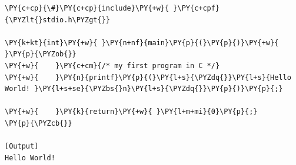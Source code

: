 \begin{Verbatim}[label=\makebox{\url{https://github.com/lucabaldini/cmepda/tree/master/slides/latex/snippets/hello_world.c}},commandchars=\\\{\}]
\PY{c+cp}{\#}\PY{c+cp}{include}\PY{+w}{ }\PY{c+cpf}{\PYZlt{}stdio.h\PYZgt{}}

\PY{k+kt}{int}\PY{+w}{ }\PY{n+nf}{main}\PY{p}{(}\PY{p}{)}\PY{+w}{ }\PY{p}{\PYZob{}}
\PY{+w}{    }\PY{c+cm}{/* my first program in C */}
\PY{+w}{    }\PY{n}{printf}\PY{p}{(}\PY{l+s}{\PYZdq{}}\PY{l+s}{Hello World! }\PY{l+s+se}{\PYZbs{}n}\PY{l+s}{\PYZdq{}}\PY{p}{)}\PY{p}{;}

\PY{+w}{    }\PY{k}{return}\PY{+w}{ }\PY{l+m+mi}{0}\PY{p}{;}
\PY{p}{\PYZcb{}}

[Output]
Hello World! 
\end{Verbatim}